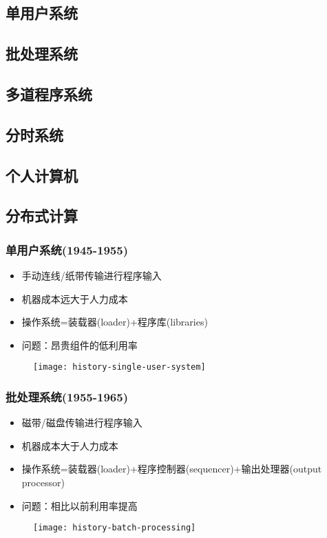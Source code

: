 \subsection{单用户系统}
\subsection{批处理系统}
\subsection{多道程序系统}
\subsection{分时系统}
\subsection{个人计算机}
\subsection{分布式计算}

\begin{frame}[plain]

\frametitle{单用户系统(1945-1955)}


\begin{itemize}
\item 手动连线/纸带传输进行程序输入
\item 机器成本远大于人力成本	
\item 操作系统=装载器(loader)+程序库(libraries) 
\item 问题：昂贵组件的低利用率
\end{itemize}

	\begin{figure}
	\centering
	\texttt{[image: history-single-user-system]}
\end{figure}

\end{frame}



\begin{frame}[plain]
	
	\frametitle{批处理系统(1955-1965)}
	
	
	\begin{itemize}
		\item 磁带/磁盘传输进行程序输入
		\item 机器成本大于人力成本	
		\item 操作系统=装载器(loader)+程序控制器(sequencer)+输出处理器(output processor)
		\item 问题：相比以前利用率提高
	\end{itemize}
	
	\begin{figure}
		\centering
		\texttt{[image: history-batch-processing]}
	\end{figure}
	
\end{frame}

